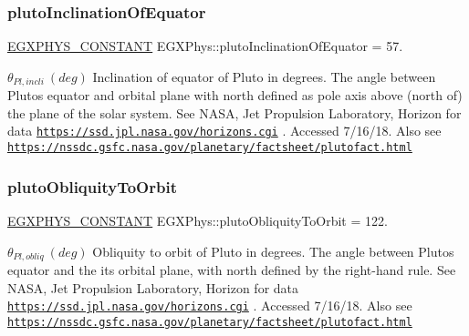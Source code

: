 \subsubsection{\texorpdfstring{pluto\+Inclination\+Of\+Equator}{plutoInclinationOfEquator}}
{\footnotesize\ttfamily \mbox{\hyperlink{group___e_g_x_phys-_constants-_macros_ga76980d288494ce1714c9ac68a95ba702}{E\+G\+X\+P\+H\+Y\+S\+\_\+\+C\+O\+N\+S\+T\+A\+NT}} E\+G\+X\+Phys\+::pluto\+Inclination\+Of\+Equator = 57.}

$ \theta_{Pl,incli} \ (deg)$ Inclination of equator of Pluto in degrees. The angle between Pluto\textquotesingle{}s equator and orbital plane with north defined as pole axis above (north of) the plane of the solar system. See N\+A\+SA, Jet Propulsion Laboratory, Horizon for data \href{https://ssd.jpl.nasa.gov/horizons.cgi}{\tt https\+://ssd.\+jpl.\+nasa.\+gov/horizons.\+cgi} . Accessed 7/16/18. Also see \href{https://nssdc.gsfc.nasa.gov/planetary/factsheet/plutofact.html}{\tt https\+://nssdc.\+gsfc.\+nasa.\+gov/planetary/factsheet/plutofact.\+html} \mbox{\label{group___e_g_x_phys-_constants-_astrophysics-_solar_system-_pluto-_orbit_ga0cbc850b3e47ba5f7776fd3c299fe531}} 
\subsubsection{\texorpdfstring{pluto\+Obliquity\+To\+Orbit}{plutoObliquityToOrbit}}
{\footnotesize\ttfamily \mbox{\hyperlink{group___e_g_x_phys-_constants-_macros_ga76980d288494ce1714c9ac68a95ba702}{E\+G\+X\+P\+H\+Y\+S\+\_\+\+C\+O\+N\+S\+T\+A\+NT}} E\+G\+X\+Phys\+::pluto\+Obliquity\+To\+Orbit = 122.}

$ \theta_{Pl,obliq} \ (deg)$ Obliquity to orbit of Pluto in degrees. The angle between Pluto\textquotesingle{}s equator and the it\textquotesingle{}s orbital plane, with north defined by the right-\/hand rule. See N\+A\+SA, Jet Propulsion Laboratory, Horizon for data \href{https://ssd.jpl.nasa.gov/horizons.cgi}{\tt https\+://ssd.\+jpl.\+nasa.\+gov/horizons.\+cgi} . Accessed 7/16/18. Also see \href{https://nssdc.gsfc.nasa.gov/planetary/factsheet/plutofact.html}{\tt https\+://nssdc.\+gsfc.\+nasa.\+gov/planetary/factsheet/plutofact.\+html} \mbox{\label{group___e_g_x_phys-_constants-_astrophysics-_solar_system-_pluto-_orbit_gac4e198fcea423f14df3db2d03c384cf4}} 
